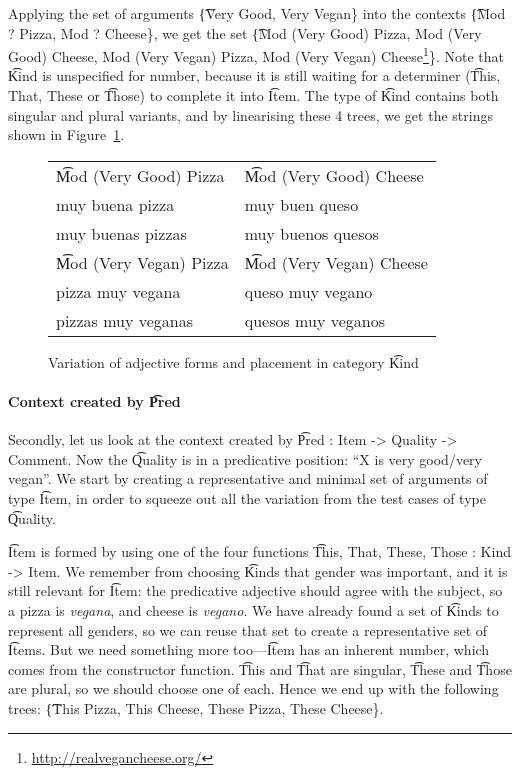 Applying the set of arguments \t{\{Very Good, Very Vegan\}} into the contexts \t{\{Mod ? Pizza, Mod ? Cheese\}}, we get the set \t{\{Mod (Very Good) Pizza, Mod (Very Good) Cheese, Mod (Very Vegan) Pizza, Mod (Very Vegan) Cheese\footnote{\url{http://realvegancheese.org/}}\}}. Note that \t{Kind} is unspecified for number, because it is still waiting for a determiner (\t{This, That, These} or \t{Those}) to complete it into \t{Item}. The type of \t{Kind} contains both singular and plural variants, and by linearising these 4 trees, we get the strings shown in Figure~\ref{fig:veganCheese}.

\begin{figure}
\centering
\begin{tabular}{| l | l |}
\hline
\t{Mod (Very Good) Pizza}   & \t{Mod (Very Good) Cheese} \\ 
muy buena pizza             & muy buen queso \\
muy buenas pizzas			& muy buenos quesos \\ \hline

\t{Mod (Very Vegan) Pizza}  & \t{Mod (Very Vegan) Cheese} \\
pizza muy vegana            & queso muy vegano \\
pizzas muy veganas          & quesos muy veganos \\ \hline
\end{tabular}
\caption{Variation of adjective forms and placement in category \t{Kind}}
\label{fig:veganCheese}
\end{figure}

\paragraph{Context created by \t{Pred}} 
Secondly, let us look at the context created by \t{Pred : Item -> Quality -> Comment}. Now the \t{Quality} is in a predicative position: ``X is very good/very vegan''.
We start by creating a representative and minimal set of arguments of type \t{Item}, in order to squeeze out all the variation from the test cases of type \t{Quality}.

\t{Item} is formed by using one of the four functions \t{This, That, These, Those : Kind -> Item}.
We remember from choosing \t{Kind}s that gender was important, and it is still relevant for \t{Item}: the predicative adjective should agree with the subject, so a pizza is \emph{vegana}, and cheese is \emph{vegano}. 
We have already found a set of \t{Kind}s to represent all genders, so we can reuse that set to create a representative set of \t{Item}s. But we need something more too---\t{Item} has an inherent number, which comes from the constructor function. \t{This} and \t{That} are singular, \t{These} and \t{Those} are plural, so we should choose one of each. Hence we end up with the following trees: \t{\{This Pizza, This Cheese, These Pizza, These Cheese\}}.

